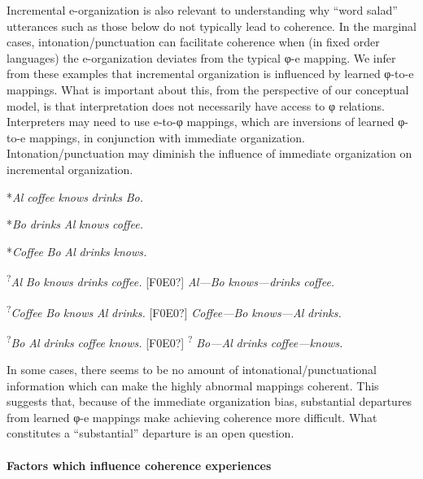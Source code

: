   Incremental e-organization is also relevant to understanding why “word salad” utterances such as those below do not typically lead to coherence. In the marginal cases, intonation/punctuation can facilitate coherence when (in fixed order languages) the e-organization deviates from the typical φ-e mapping. We infer from these examples that incremental organization is influenced by learned φ-to-e mappings. What is important about this, from the perspective of our conceptual model, is that interpretation does not necessarily have access to φ relations. Interpreters may need to use e-to-φ mappings, which are inversions of learned φ-to-e mappings, in conjunction with immediate organization. Intonation/punctuation may diminish the influence of immediate organization on incremental organization. 

    *\textit{Al} \textit{coffee} \textit{knows} \textit{drinks} \textit{Bo.}  

    *\textit{Bo} \textit{drinks} \textit{Al} \textit{knows} \textit{coffee.}

    *\textit{Coffee} \textit{Bo} \textit{Al} \textit{drinks} \textit{knows.}

    \textsuperscript{?}\textit{Al} \textit{Bo} \textit{knows} \textit{drinks} \textit{coffee.}   [F0E0?]   \textit{Al—Bo} \textit{knows—drinks} \textit{coffee.}

    \textsuperscript{?}\textit{Coffee} \textit{Bo} \textit{knows} \textit{Al} \textit{drinks.}   [F0E0?]  \textit{Coffee—Bo} \textit{knows—Al} \textit{drinks.}

    \textsuperscript{?}\textit{Bo} \textit{Al} \textit{drinks} \textit{coffee} \textit{knows.}  [F0E0?]  \textsuperscript{?} \textit{Bo—Al} \textit{drinks} \textit{coffee—knows.}

  In some cases, there seems to be no amount of intonational/punctuational information which can make the highly abnormal mappings coherent. This suggests that, because of the immediate organization bias, substantial departures from learned φ-e mappings make achieving coherence more difficult. What constitutes a “substantial” departure is an open question.

\paragraph{Factors which influence coherence experiences}

